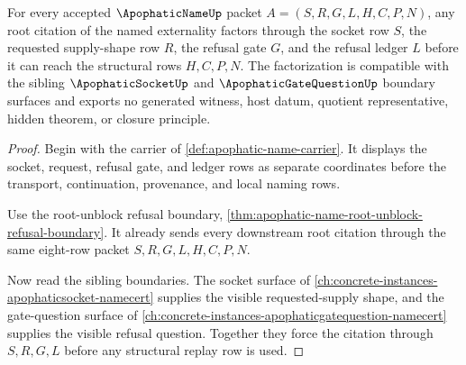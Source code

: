 \begin{theorem}
\label{thm:apophatic-name-root-socket-gate-factorization}
For every accepted $\ApophaticNameUp$ packet $A=(S,R,G,L,H,C,P,N)$, any root citation of the named externality factors through the socket row $S$, the requested supply-shape row $R$, the refusal gate $G$, and the refusal ledger $L$ before it can reach the structural rows $H,C,P,N$. The factorization is compatible with the sibling $\ApophaticSocketUp$ and $\ApophaticGateQuestionUp$ boundary surfaces and exports no generated witness, host datum, quotient representative, hidden theorem, or closure principle.
\end{theorem}
\begin{proof}
Begin with the carrier of \autoref{def:apophatic-name-carrier}. It displays the socket, request, refusal gate, and ledger rows as separate coordinates before the transport, continuation, provenance, and local naming rows.

Use the root-unblock refusal boundary, \autoref{thm:apophatic-name-root-unblock-refusal-boundary}. It already sends every downstream root citation through the same eight-row packet $S,R,G,L,H,C,P,N$.

Now read the sibling boundaries. The socket surface of \autoref{ch:concrete-instances-apophaticsocket-namecert} supplies the visible requested-supply shape, and the gate-question surface of \autoref{ch:concrete-instances-apophaticgatequestion-namecert} supplies the visible refusal question. Together they force the citation through $S,R,G,L$ before any structural replay row is used.
\end{proof}

